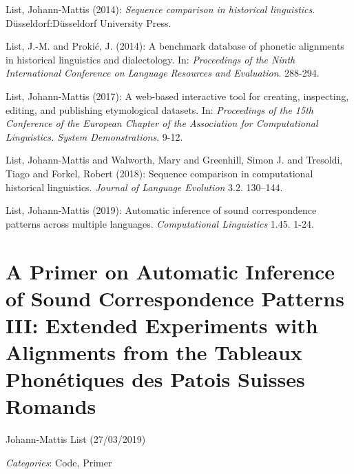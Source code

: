 \documentclass[
  a4paper,
  14pt,
  oneside,
  tablecaptionabove
]{scrbook}
\begin{document}
\nopagebreak\hangindent=0.7cm {\small  List, Johann-Mattis (2014): \emph{Sequence comparison in historical
linguistics}. Düsseldorf:Düsseldorf University Press.}

\nopagebreak\hangindent=0.7cm {\small  List, J.-M. and Prokić, J. (2014): A benchmark database of phonetic
alignments in historical linguistics and dialectology. In: \emph{Proceedings
of the Ninth International Conference on Language Resources and
Evaluation}. 288-294. }

\nopagebreak\hangindent=0.7cm {\small  List, Johann-Mattis (2017): A web-based interactive tool for
creating, inspecting, editing, and publishing etymological datasets. In:
\emph{Proceedings of the 15th Conference of the European Chapter of the
Association for Computational Linguistics. System Demonstrations}.
9-12.}

\nopagebreak\hangindent=0.7cm {\small  List, Johann-Mattis and Walworth, Mary and Greenhill, Simon J. and
Tresoldi, Tiago and Forkel, Robert (2018): Sequence comparison in
computational historical linguistics. \emph{Journal of Language
Evolution} 3.2. 130--144. }

\nopagebreak\hangindent=0.7cm {\small  List, Johann-Mattis (2019): Automatic inference of sound
correspondence patterns across multiple languages. \emph{Computational
Linguistics} 1.45. 1-24. }




\newpage
\section*{A Primer on Automatic Inference of Sound Correspondence
Patterns III: Extended Experiments with Alignments from the Tableaux
Phonétiques des Patois Suisses Romands}

Johann-Mattis List (27/03/2019)

\emph{Categories}: Code, Primer
\end{document}
